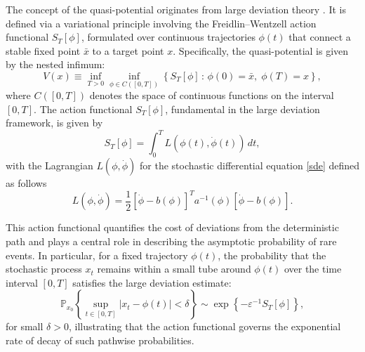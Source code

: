 \documentclass[11pt]{article}
\theoremstyle{plain}      %
\theoremstyle{definition} %
\begin{document}
The concept of the quasi-potential originates from large deviation theory \cite{Freidlin2012}. It is defined via a variational principle involving the Freidlin–Wentzell action functional \( S_T[\phi] \), formulated over continuous trajectories \( \phi(t) \) that connect a stable fixed point \( \bar{x} \) to a target point \( x \). Specifically, the quasi-potential is given by the nested infimum:
\begin{equation}
\label{quasip}
V(x) \equiv \inf_{T > 0} \inf_{\phi \in C([0, T])} \left\{ S_T[\phi] \,:\, \phi(0) = \bar{x},\; \phi(T) = x \right\},
\end{equation}
where \( C([0,T]) \) denotes the space of continuous functions on the interval \([0, T]\). The action functional \( S_T[\phi] \), fundamental in the large deviation framework, is given by
\begin{equation}
\label{actionf}
S_T[\phi] = \int_0^T L(\phi(t), \dot{\phi}(t))\,dt,
\end{equation}
with the Lagrangian \( L(\phi, \dot{\phi}) \) for the stochastic differential equation \eqref{sde} defined as follows
\begin{equation}
\label{Lagran}
L(\phi, \dot{\phi}) = \frac{1}{2} \left[ \dot{\phi} - b(\phi) \right]^{\!\!T} a^{-1}(\phi) \left[ \dot{\phi} - b(\phi) \right].
\end{equation}

This action functional quantifies the cost of deviations from the deterministic path and plays a central role in describing the asymptotic probability of rare events. In particular, for a fixed trajectory \( \phi(t) \), the probability that the stochastic process \( x_t \) remains within a small tube around \( \phi(t) \) over the time interval \([0, T]\) satisfies the large deviation estimate:
\begin{equation}
\label{LDP}
\mathbb{P}_{x_0} \left\{ \sup_{t \in [0, T]} \left| x_t - \phi(t) \right| < \delta \right\} \sim \exp\left\{ -\varepsilon^{-1} S_T[\phi] \right\},
\end{equation}
for small \( \delta > 0 \), illustrating that the action functional governs the exponential rate of decay of such pathwise probabilities.
\end{document}
